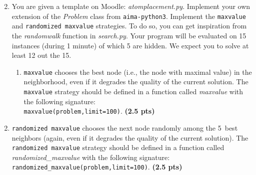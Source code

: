\documentclass[11pt,a4paper]{report}
\begin{document}
\begin{answers}[6cm]
\end{answers}


\begin{enumerate}
\setcounter{enumi}{1}
    \item You are given a template on Moodle: \textit{atomplacement.py}. Implement your own extension of the \textit{Problem} class from \texttt{aima-python3}. Implement the \texttt{maxvalue} and \texttt{randomized maxvalue} strategies. To do so,
	you can get inspiration from the \textit{randomwalk} function in \textit{search.py}. Your program will be evaluated on 15 instances (during 1 minute) of which 5 are hidden. We expect you to solve at least 12 out the 15.
    \begin{enumerate}
        \item \texttt{maxvalue} chooses the best node (i.e., the node with maximal
        value) in the neighborhood, even if it degrades the quality of the current solution. 
        The \texttt{maxvalue} strategy should be defined in a function called
        \textit{maxvalue} with the following signature: \\
        \texttt{maxvalue(problem,limit=100)}. \textbf{(2.5 pts)}
    \end{enumerate}
\end{enumerate}

\begin{answers}[2.5 cm]
\end{answers}



\begin{enumerate}
\setcounter{enumi}{1}
\begin{enumerate}
\setcounter{enumii}{1}
    \item \texttt{randomized maxvalue} chooses the next node randomly among
        the 5~best neighbors (again, even if it degrades the quality of the current solution).
        The \texttt{randomized maxvalue} strategy should be defined in a function called
        \textit{randomized\_maxvalue} with the following signature: \\
        \texttt{randomized\_maxvalue(problem,limit=100)}. \textbf{(2.5 pts)}
\end{enumerate}
\end{enumerate}

\begin{answers}[2.5 cm]
\end{answers}
\end{document}
